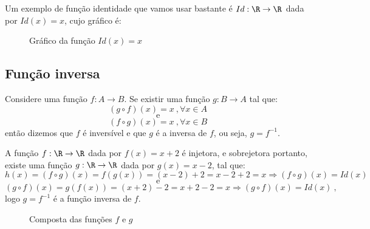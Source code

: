 Um exemplo de função identidade que vamos usar bastante é $Id: \R \rightarrow \R$ dada por $Id(x)= x$, cujo gráfico é:
\begin{figure}[H]
 \centering
    \caption{Gráfico da função $Id(x)=x$}
  \end{figure}

\subsection{Função inversa}

Considere uma função $f: A \rightarrow B$. Se existir uma função $g: B \rightarrow A$ tal que:
\[(g \circ f)(x)= x \ , \forall x \in A\]
\[ \text {e}\]
\[(f \circ g)(x)= x \ , \forall x \in B\]
então dizemos que $f$ é inversível e que $g$ é a inversa de $f$, ou seja, $g= f^{-1}$.

\begin{exem}
 A função $f: \R \rightarrow \R$ dada por $f(x)= x+2$ é injetora, e sobrejetora portanto, existe uma função $g: \R \rightarrow \R$ dada por $g(x)= x-2$, tal que:
 \[h(x)= (f \circ g)(x)= f(g(x))= (x-2) + 2= x-2+2= x \Rightarrow (f \circ g)(x)= Id(x)\]
 \[\text{e}\]
 \[(g \circ f)(x)= g(f(x))= (x+2) - 2= x+2-2= x \Rightarrow (g \circ f)(x)= Id(x) \ ,\]
 logo $g= f^{-1}$ é a função inversa de $f$.

 \begin{figure}[H]
 \centering
    \caption{Composta das funções $f$ e $g$}
  \end{figure}

\end{exem}


